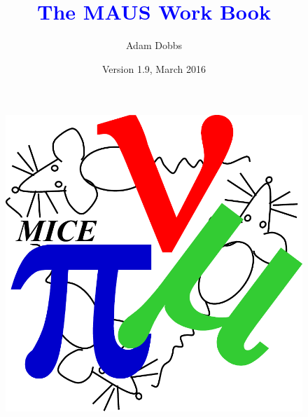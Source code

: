 \documentclass[a4paper,10pt]{article}
\title{\textcolor{blue}{The MAUS Work Book}}
\author{Adam Dobbs}
\date{Version 1.9, March 2016}
\begin{document}
\thispagestyle{empty}

\vspace*{1cm}

{\let\newpage\relax\maketitle}

\reversemarginpar

\thispagestyle{empty}
\vspace{2cm}

\begin{figure}[h]
 \begin{center}
   \includegraphics[width=0.29\linewidth]{./graphics/mice-logo.pdf}
 \end{center}
\end{figure}

\vspace{5cm}

\pagebreak

\tableofcontents

\pagebreak
\end{document}
